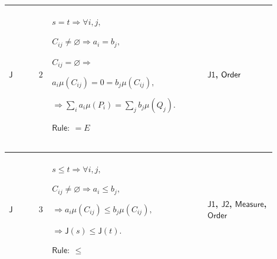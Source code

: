 \documentclass[12pt,reqno]{amsart}
\theoremstyle{blueplain}
\numberwithin{equation}{section}
\begin{document}
{\scriptsize \setlength{\parskip}{0pt}\nointerlineskip
\noindent 
\begin{tabular}{|@{}>{\centering\arraybackslash}m{0.10658\linewidth}|>{\centering\arraybackslash}m{0.03553\linewidth}|>{\centering\arraybackslash}m{0.52105\linewidth}|>{\centering\arraybackslash}m{0.23684\linewidth}|}
\hline
\hypertarget{proof:J2}{$\displaystyle \mathsf{J}$} & $\displaystyle 2$ & $%
\displaystyle s=t\Rightarrow\forall i,j,$\par$\displaystyle %
C_{ij}\ne\varnothing\Rightarrow a_i=b_j,$\par$\displaystyle %
C_{ij}=\varnothing\Rightarrow$\par$\displaystyle a_i\mu(C_{ij})=0=b_j%
\mu(C_{ij}),$\par$\displaystyle \Rightarrow\sum_i a_i\mu(P_i)=\sum_j
b_j\mu(Q_j).$\par$\displaystyle \mathsf{Rule}:\ =E$ & \hyperlink{proof:J1}{$%
\displaystyle \mathsf{J1}$}, \hyperlink{ax:Order}{$\displaystyle \mathsf{%
Order}$} \\ \hline
\end{tabular}%
}

{\scriptsize \setlength{\parskip}{0pt}\nointerlineskip
\noindent 
\begin{tabular}{|@{}>{\centering\arraybackslash}m{0.10658\linewidth}|>{\centering\arraybackslash}m{0.03553\linewidth}|>{\centering\arraybackslash}m{0.52105\linewidth}|>{\centering\arraybackslash}m{0.23684\linewidth}|}
\hline
\hypertarget{proof:J3}{$\displaystyle \mathsf{J}$} & $\displaystyle 3$ & $%
\displaystyle s\le t\Rightarrow\forall i,j,$\par$\displaystyle %
C_{ij}\ne\varnothing\Rightarrow a_i\le b_j,$\par$\displaystyle \Rightarrow
a_i\mu(C_{ij})\le b_j\mu(C_{ij}),$\par$\displaystyle \Rightarrow\mathsf{J}%
(s)\le\mathsf{J}(t).$\par$\displaystyle \mathsf{Rule}:\ \le$ & \hyperlink{proof:J1}%
{$\displaystyle \mathsf{J1}$}, \hyperlink{proof:J2}{$\displaystyle \mathsf{J2%
}$}, \hyperlink{ax:Measure}{$\displaystyle \mathsf{Measure}$}, \hyperlink{ax:Order}%
{$\displaystyle \mathsf{Order}$} \\ \hline
\end{tabular}%
}
\end{document}
